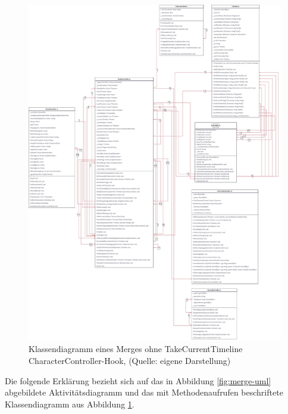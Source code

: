 \begin{figure}[ht]
\centering
\includegraphics[width=1\linewidth]{content/pictures/merge_classes.jpg}
\caption{Klassendiagramm eines Merges ohne TakeCurrentTimeline \\ CharacterController-Hook, (Quelle: eigene Darstellung)}
\label{fig:merge-class}
\end{figure}

Die folgende Erklärung bezieht sich auf das in Abbildung \ref{fig:merge-uml} abgebildete Aktivitätsdiagramm und das mit Methodenaufrufen beschriftete Klassendiagramm aus Abbildung \ref{fig:merge-class}.

